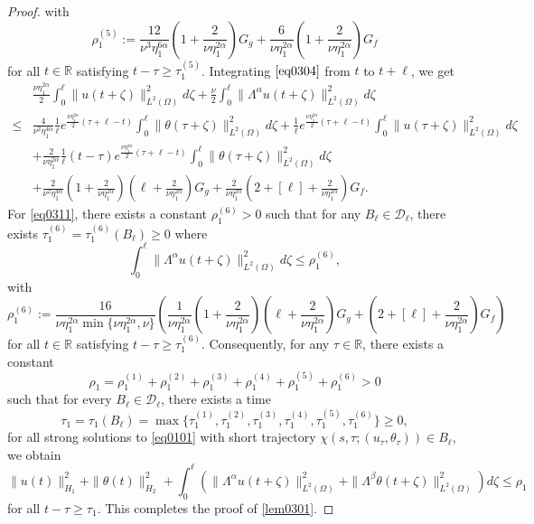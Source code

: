 \documentclass[oneside,preprint,12pt,numbers,sort&compress]{elsarticle}
\begin{document}
\begin{proof}
with
\[
    \rho_{1}^{(5)} 
    := \frac{12}{\nu^{3}\eta_1^{6\alpha}} 
   \left(1+\frac{2}{\nu\eta_1^{2\alpha}}\right)
   G_g
   + \frac{6}{\nu\eta_1^{2\alpha}} \left(1+\frac{2}{\nu\eta_1^{2\alpha}}\right)G_f
\]
for all $t \in \mathbb{R}$ satisfying $t - \tau \geq \tau_{1}^{(5)}$. Integrating $\eqref{eq0304}$ from $t$ to $t+\ell$, we get
\begin{equation}\label{eq0311}
\begin{aligned}
  &\frac{\nu\eta_1^{2\alpha}}{2} \int_{0}^{\ell} \|u(t+\zeta)\|_{L^2(\Omega)}^2 d\zeta + \frac{\nu}{2} \int_{0}^{\ell} \| \Lambda^\alpha u(t+\zeta)\|_{L^2(\Omega)}^2 d\zeta \\
  \leq 
  & 
  \frac{4}{\nu^{2}\eta_1^{4\alpha}} \frac{1}{\ell} e^{\frac{\nu\eta_1^{2\alpha}}{2}(\tau+\ell-t)} \int_{0}^{\ell} \|\theta(\tau+\zeta)\|_{L^2(\Omega)}^2 d\zeta
  + \frac{1}{\ell} e^{\frac{\nu\eta_1^{2\alpha}}{2}(\tau+\ell-t)}  \int_{0}^{\ell} \|u(\tau+\zeta)\|_{L^2(\Omega)}^2 d\zeta \\
  &
  + \frac{2}{\nu\eta_1^{2\alpha}}
   \frac{1}{\ell}(t-\tau)
   e^{\frac{\nu\eta_1^{2\alpha}}{2}(\tau+\ell-t)}
   \int_{0}^{\ell} 
   \|\theta(\tau+\zeta)\|_{L^2(\Omega)}^2  d\zeta \\
  &
  + \frac{2}{\nu^{2}\eta_1^{4\alpha}} 
  \left(1+\frac{2}{\nu\eta_1^{2\alpha}}\right)
  \left(\ell+\frac{2}{\nu\eta_1^{2\alpha}}\right)
  G_g
  + \frac{2}{\nu\eta_1^{2\alpha}} \left(2+[\ell]+\frac{2}{\nu\eta_1^{2\alpha}}\right)G_f.
\end{aligned}
\end{equation}
For \cref{eq0311}, there exists a constant $\rho_{1}^{(6)} > 0$ such that for any $B_{\ell} \in \mathcal{D}_{\ell}$, there exists $\tau_{1}^{(6)} = \tau_{1}^{(6)}(B_{\ell}) \geq 0$ where  
\begin{equation}\label{eq0312}
    \int_{0}^{\ell} \| \Lambda^\alpha u(t+\zeta)\|_{L^2(\Omega)}^2 d\zeta
    \leq 
    \rho_{1}^{(6)},
\end{equation}
with
\[
    \rho_{1}^{(6)} 
    := 
    \frac{16}{\nu\eta_1^{2\alpha}\min\{\nu\eta_1^{2\alpha},\nu\}}
    \left(
    \frac{1}{\nu\eta_1^{2\alpha}} 
    \left(1+\frac{2}{\nu\eta_1^{2\alpha}}\right)
    \left(\ell+\frac{2}{\nu\eta_1^{2\alpha}}\right)
    G_g
    + \left(2+[\ell]+\frac{2}{\nu\eta_1^{2\alpha}}\right)G_f
    \right)
\]
for all $t \in \mathbb{R}$ satisfying $t - \tau \geq \tau_{1}^{(6)}$.
Consequently, for any $\tau \in \mathbb{R}$, there exists a constant 
$$
\rho_1=\rho_{1}^{(1)}+\rho_{1}^{(2)}+\rho_{1}^{(3)}+
\rho_{1}^{(4)}+\rho_{1}^{(5)}+\rho_{1}^{(6)}>0
$$
such that for every $B_{\ell} \in \mathcal{D}_{\ell}$, there exists a time 
$$
\tau_1 =\tau_1(B_{\ell})=\max\{\tau_{1}^{(1)},
            \tau_{1}^{(2)},
            \tau_{1}^{(3)},
            \tau_{1}^{(4)},
            \tau_{1}^{(5)},
            \tau_{1}^{(6)}\}\geq 0 ,
$$
for all strong solutions to \cref{eq0101} with short trajectory $\chi(s,\tau; (u_\tau, \theta_\tau)) \in B_{\ell}$, we obtain
\[
\| u(t) \|_{H_{1}}^{2}
+ \| \theta(t) \|_{H_{2}}^{2}
+ \int_{0}^{\ell} \left(
\| \Lambda^\alpha u(t+\zeta)\|_{L^2(\Omega)}^2 + \| \Lambda^\beta \theta(t+\zeta)\|_{L^2(\Omega)}^2 \right) d\zeta
\leq \rho_1 
\]%
for all $t-\tau \geq \tau_1$. This completes the proof of \cref{lem0301}.
\end{proof}
\end{document}
